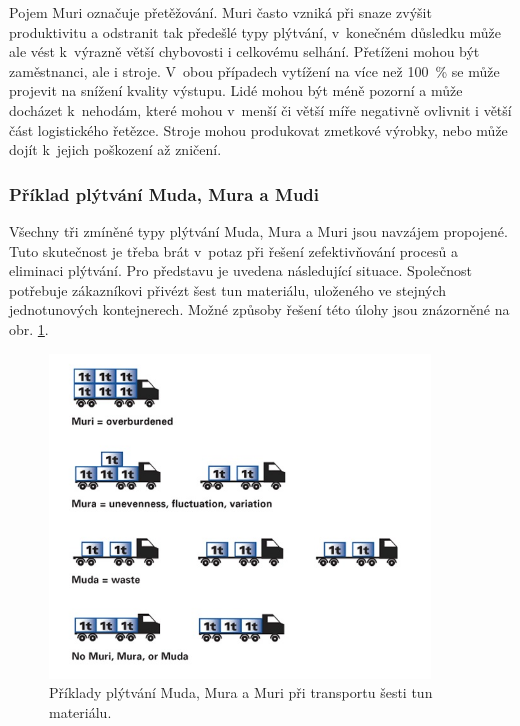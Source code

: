 Pojem Muri označuje přetěžování. Muri často vzniká při snaze zvýšit produktivitu a odstranit tak předešlé typy plýtvání, v~konečném důsledku může ale vést k~výrazně větší chybovosti i celkovému selhání. Přetíženi mohou být zaměstnanci, ale i stroje. V~obou případech vytížení na více než 100~\% se může projevit na snížení kvality výstupu.  Lidé mohou být méně pozorní a může docházet k~nehodám, které mohou v~menší či větší míře negativně ovlivnit i větší část logistického řetězce. Stroje mohou produkovat zmetkové výrobky, nebo může dojít k~jejich poškození až zničení.\cite{bib:Jirsak,bib:LW3}

\subsubsection*{Příklad plýtvání Muda, Mura a Mudi}

Všechny tři zmíněné typy plýtvání Muda, Mura a Muri jsou navzájem propojené. Tuto skutečnost je třeba brát v~potaz při řešení zefektivňování procesů a eliminaci plýtvání. Pro představu je uvedena následující situace. Společnost potřebuje zákazníkovi přivézt šest tun materiálu, uloženého ve stejných jednotunových kontejnerech. Možné způsoby řešení této úlohy jsou znázorněné na obr. \ref{obr:log:3M}.\cite{bib:LW3}

\begin{figure}[h!]
    \centering
    \includegraphics[width=0.9\textwidth]{obrazky/3M.jpg}
    \caption{Příklady plýtvání Muda, Mura a Muri při transportu šesti tun materiálu.\cite{bib:LW3}}
    \label{obr:log:3M}
\end{figure}

